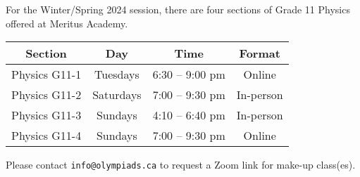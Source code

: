 \documentclass{../oss-handout}
\begin{document}
For the Winter/Spring 2024 session, there are four sections of Grade 11 Physics
offered at Meritus Academy.
\begin{center}
  \begin{tabular}{|c|c|c|c|}
    \hline
    \rowcolor{lightgray}
    \textbf{Section} & \textbf{Day} & \textbf{Time} & \textbf{Format}\\
    \hline\hline
    Physics G11-1 & Tuesdays  & 6:30 -- 9:00 pm & Online \\
    \hline
    \hspace{.3in}Physics G11-2\hspace{.3in} &
    \hspace{.3in}Saturdays\hspace{.3in} &
    \hspace{.3in}7:00 -- 9:30 pm\hspace{.3in} &
    \hspace{.3in}In-person\hspace{.3in} \\
    \hline
    Physics G11-3 & Sundays   & 4:10 -- 6:40 pm & In-person \\
    \hline
    Physics G11-4 & Sundays   & 7:00 -- 9:30 pm & Online \\
    \hline
  \end{tabular}
\end{center}
Please contact \texttt{info@olympiads.ca} to request a Zoom link for make-up
class(es).
\end{document}

